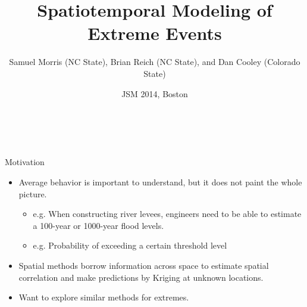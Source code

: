 \documentclass{beamer}
\title[Spatiotemporal Modeling of Extreme Events] %
{
  Spatiotemporal Modeling of Extreme Events
}
\author[S. Morris, B. Reich, and D. Cooley]{Samuel Morris (NC State), Brian Reich (NC State), and Dan Cooley (Colorado State)}
\institute[NCSU, CSU]{}
\date{JSM 2014, Boston}
\begin{document}
\begin{frame}\frametitle{\ }
\begin{center}
	\maketitle
\end{center}
\end{frame}

\begin{frame}{Motivation}
  \begin{itemize} \setlength{\itemsep}{1em}
    \item Average behavior is important to understand, but it does not paint the whole picture.
    \begin{itemize}
      \item e.g. When constructing river levees, engineers need to be able to estimate a 100-year or 1000-year flood levels.
      \item e.g. Probability of exceeding a certain threshold level
    \end{itemize}
    \item Spatial methods borrow information across space to estimate spatial correlation and make predictions by Kriging at unknown locations.
    \item Want to explore similar methods for extremes.
  \end{itemize}
\end{frame}

\end{document}
